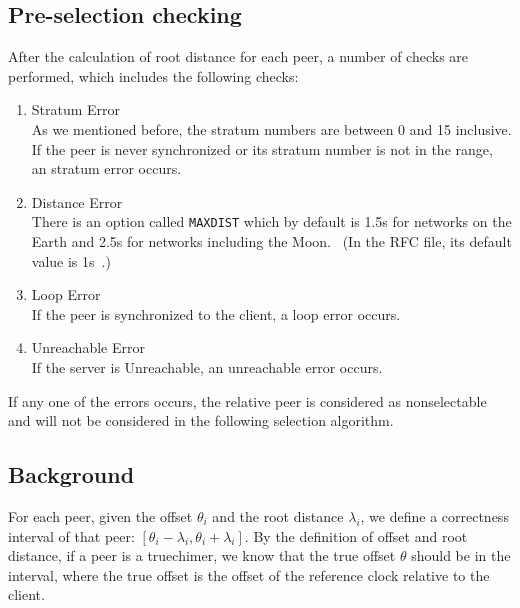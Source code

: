 \subsection{Pre-selection checking}%
\label{sub:pre_selection_checking}
After the calculation of root distance for each peer, a number of checks are
performed, which includes the following checks:
\begin{enumerate}
    \item Stratum Error\\
        As we mentioned before, the stratum numbers are between 0 and 15
        inclusive. If the peer is never synchronized or its stratum number is
        not in the range, an stratum error occurs.
    \item Distance Error\\
        There is an option called \verb|MAXDIST| which by default is 1.5s for
        networks on the Earth and 2.5s for networks including the
        Moon.~\cite{clock_selection} (In the RFC file, its default value is
        1s~\cite{rfc5905}.)
    \item Loop Error\\
        If the peer is synchronized to the client, a loop error occurs.
    \item Unreachable Error\\
        If the server is Unreachable, an unreachable error occurs.
\end{enumerate}
If any one of the errors occurs, the relative peer is considered as
nonselectable and will not be considered in the following selection
algorithm.

\subsection{Background}%
\label{sub:selection_algorithm_background}

For each peer, given the offset $\theta_i$ and the root distance $\lambda_i$,
we define a correctness interval of that peer: $[\theta_i - \lambda_i,
\theta_i + \lambda_i]$. By the definition of offset and root distance, if a
peer is a truechimer, we know that the true offset $\theta$ should be in the
interval, where the true offset is the offset of the reference clock relative
to the client.

